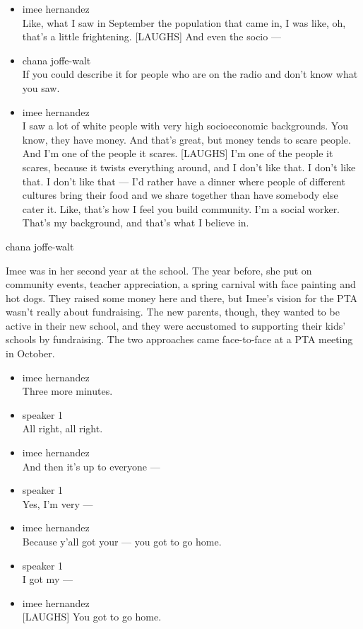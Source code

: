 \begin{itemize}
\item
  imee hernandez\\
  Like, what I saw in September the population that came in, I was like,
  oh, that's a little frightening. {[}LAUGHS{]} And even the socio ---
\item
  chana joffe-walt\\
  If you could describe it for people who are on the radio and don't
  know what you saw.
\item
  imee hernandez\\
  I saw a lot of white people with very high socioeconomic backgrounds.
  You know, they have money. And that's great, but money tends to scare
  people. And I'm one of the people it scares. {[}LAUGHS{]} I'm one of
  the people it scares, because it twists everything around, and I don't
  like that. I don't like that. I don't like that --- I'd rather have a
  dinner where people of different cultures bring their food and we
  share together than have somebody else cater it. Like, that's how I
  feel you build community. I'm a social worker. That's my background,
  and that's what I believe in.
\end{itemize}

chana joffe-walt

Imee was in her second year at the school. The year before, she put on
community events, teacher appreciation, a spring carnival with face
painting and hot dogs. They raised some money here and there, but Imee's
vision for the PTA wasn't really about fundraising. The new parents,
though, they wanted to be active in their new school, and they were
accustomed to supporting their kids' schools by fundraising. The two
approaches came face-to-face at a PTA meeting in October.

\begin{itemize}
\item
  imee hernandez\\
  Three more minutes.
\item
  speaker 1\\
  All right, all right.
\item
  imee hernandez\\
  And then it's up to everyone ---
\item
  speaker 1\\
  Yes, I'm very ---
\item
  imee hernandez\\
  Because y'all got your --- you got to go home.
\item
  speaker 1\\
  I got my ---
\item
  imee hernandez\\
  {[}LAUGHS{]} You got to go home.
\end{itemize}

